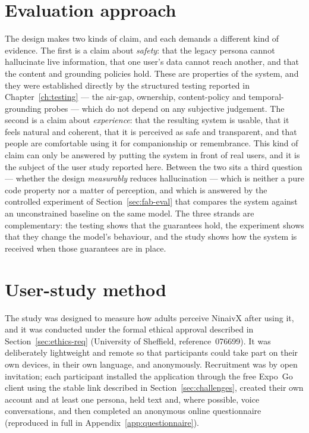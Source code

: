 \documentclass[11pt,a4paper]{report}
\begin{document}
\section{Evaluation approach}
The design makes two kinds of claim, and each demands a different kind of evidence. The first is a claim about \emph{safety}: that the legacy persona cannot hallucinate live information, that one user's data cannot reach another, and that the content and grounding policies hold. These are properties of the system, and they were established directly by the structured testing reported in Chapter~\ref{ch:testing} --- the air-gap, ownership, content-policy and temporal-grounding probes --- which do not depend on any subjective judgement. The second is a claim about \emph{experience}: that the resulting system is usable, that it feels natural and coherent, that it is perceived as safe and transparent, and that people are comfortable using it for companionship or remembrance. This kind of claim can only be answered by putting the system in front of real users, and it is the subject of the user study reported here. Between the two sits a third question --- whether the design \emph{measurably} reduces hallucination --- which is neither a pure code property nor a matter of perception, and which is answered by the controlled experiment of Section~\ref{sec:fab-eval} that compares the system against an unconstrained baseline on the same model. The three strands are complementary: the testing shows that the guarantees hold, the experiment shows that they change the model's behaviour, and the study shows how the system is received when those guarantees are in place.

\section{User-study method}
\label{sec:eval-method}
The study was designed to measure how adults perceive NinaivX after using it, and it was conducted under the formal ethical approval described in Section~\ref{sec:ethics-req} (University of Sheffield, reference~076699). It was deliberately lightweight and remote so that participants could take part on their own devices, in their own language, and anonymously. Recruitment was by open invitation; each participant installed the application through the free Expo~Go client using the stable link described in Section~\ref{sec:challenges}, created their own account and at least one persona, held text and, where possible, voice conversations, and then completed an anonymous online questionnaire (reproduced in full in Appendix~\ref{app:questionnaire}).
\end{document}
